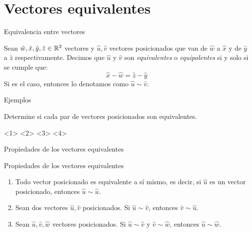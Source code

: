     \section{Vectores equivalentes}
    \begin{frame}{Equivalencia entre vectores}
        \begin{mdefinition}
            Sean $\hat{w},\hat{x},\hat{y},\hat{z}\in\rmath[2]$ vectores y $\hat{u}, \hat{v}$ vectores posicionados que van de $\hat{w}$ a $\hat{x}$ y de $\hat{y}$ a $\hat{z}$ respectivamente. Decimos que $\hat{u}$ y $\hat{v}$ son \emph{equivalentes} o \emph{equipolentes} si y solo si se cumple que:
            \[\hat{x} - \hat{w} = \hat{z} - \hat{y}\]
            Si es el caso, entonces lo denotamos como $\hat{u}\sim\hat{v}$.
        \end{mdefinition}
    \end{frame}
    \begin{frame}{Ejemplos}
        \begin{example}
            Determine si cada par de vectores posicionados son equivalentes.
            \begin{itemize}
                <1>
                <2>
                <3>
                <4>
            \end{itemize}
        \end{example}
    \end{frame}
    \begin{frame}{Propiedades de los vectores equivalentes}
        \begin{mtheorem}{Propiedades de los vectores equivalentes}
            \begin{enumerate}
                \item Todo vector posicionado es equivalente a sí mismo, es decir, si $\hat{u}$ es un vector posicionado, entonces $\hat{u}\sim\hat{u}$.
                \item Sean dos vectores $\hat{u},\hat{v}$ posicionados. Si $\hat{u}\sim\hat{v}$, entonces $\hat{v}\sim\hat{u}$.
                \item Sean $\hat{u},\hat{v},\hat{w}$ vectores posicionados. Si $\hat{u}\sim\hat{v}$ y $\hat{v}\sim\hat{w}$, entonces $\hat{u}\sim\hat{w}$.
            \end{enumerate}
        \end{mtheorem}
    \end{frame}
